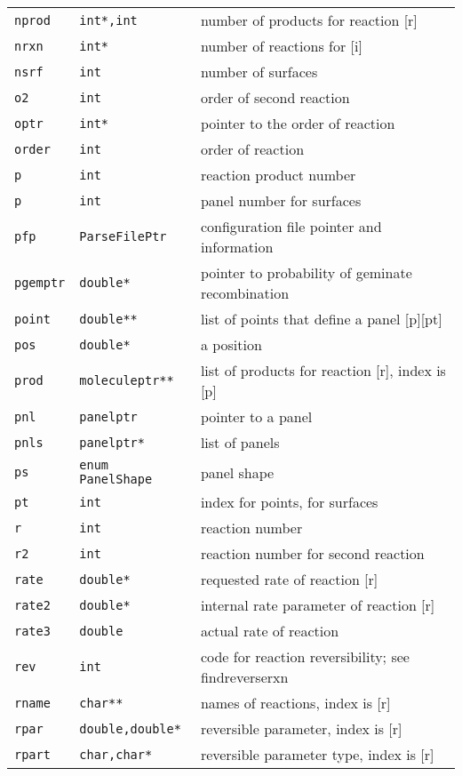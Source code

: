 \documentclass {book}
\newcommand {\ttt} {\texttt}
\begin{document}
\begin{longtable}[c]{lll}
\ttt{nprod} & \ttt{int*,int} & number of products for reaction [r]\\
\ttt{nrxn} & \ttt{int*} & number of reactions for [i]\\
\ttt{nsrf} & \ttt{int} & number of surfaces\\
\ttt{o2} & \ttt{int} & order of second reaction\\
\ttt{optr} & \ttt{int*} & pointer to the order of reaction\\
\ttt{order} & \ttt{int} & order of reaction\\
\ttt{p} & \ttt{int} & reaction product number\\
\ttt{p} & \ttt{int} & panel number for surfaces\\
\ttt{pfp} & \ttt{ParseFilePtr} & configuration file pointer and information\\
\ttt{pgemptr} & \ttt{double*} & pointer to probability of geminate recombination\\
\ttt{point} & \ttt{double**} & list of points that define a panel [p][pt]\\
\ttt{pos} & \ttt{double*} & a position\\
\ttt{prod} & \ttt{moleculeptr**} & list of products for reaction [r], index is [p]\\
\ttt{pnl} & \ttt{panelptr} & pointer to a panel\\
\ttt{pnls} & \ttt{panelptr*} & list of panels\\
\ttt{ps} & \ttt{enum PanelShape} & panel shape\\
\ttt{pt} & \ttt{int} & index for points, for surfaces\\
\ttt{r} & \ttt{int} & reaction number\\
\ttt{r2} & \ttt{int} & reaction number for second reaction\\
\ttt{rate} & \ttt{double*} & requested rate of reaction [r]\\
\ttt{rate2} & \ttt{double*} & internal rate parameter of reaction [r]\\
\ttt{rate3} & \ttt{double} & actual rate of reaction\\
\ttt{rev} & \ttt{int} & code for reaction reversibility; see findreverserxn\\
\ttt{rname} & \ttt{char**} & names of reactions, index is [r]\\
\ttt{rpar} & \ttt{double,double*} & reversible parameter, index is [r]\\
\ttt{rpart} & \ttt{char,char*} & reversible parameter type, index is [r]\\

\end{longtable}
\end{document}
